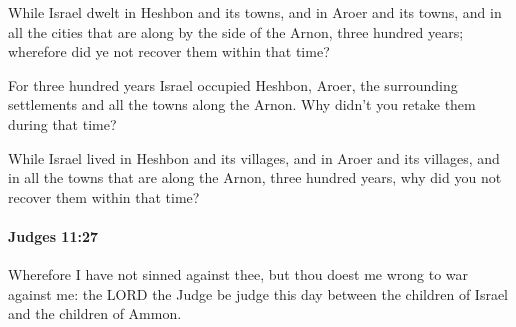 			\begin{versebox}
					\item[BHS] 
					\item[ASV] While Israel dwelt in Heshbon and its towns, and in Aroer and its towns, and in all the cities that are along by the side of the Arnon, three hundred years; wherefore did ye not recover them within that time?
					\item[NIV] For three hundred years Israel occupied Heshbon, Aroer, the surrounding settlements and all the towns along the Arnon. Why didn’t you retake them during that time?
					\item[NRSV] While Israel lived in Heshbon and its villages, and in Aroer and its villages, and in all the towns that are along the Arnon, three hundred years, why did you not recover them within that time?
			\end{versebox}

		\paragraph{Judges 11:27} %
			\label{JUDGES-11-27}

			Wherefore I have not sinned against thee, but thou doest me wrong to war against me: the LORD the Judge be judge this day between the children of Israel and the children of Ammon.

